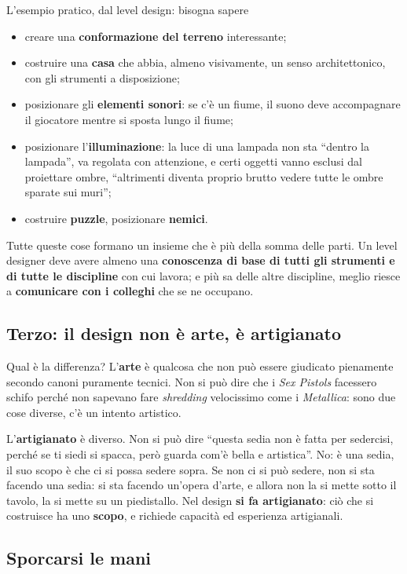 L'esempio pratico, dal level design: bisogna sapere
\begin{itemize}
  \item creare una \textbf{conformazione del terreno} interessante;
  \item costruire una \textbf{casa} che abbia, almeno visivamente, un senso
        architettonico, con gli strumenti a disposizione;
  \item posizionare gli \textbf{elementi sonori}: se c'è un fiume, il suono
        deve accompagnare il giocatore mentre si sposta lungo il fiume;
  \item posizionare l'\textbf{illuminazione}: la luce di una lampada non sta
        ``dentro la lampada'', va regolata con attenzione, e certi oggetti
        vanno esclusi dal proiettare ombre, ``altrimenti diventa proprio
        brutto vedere tutte le ombre sparate sui muri'';
  \item costruire \textbf{puzzle}, posizionare \textbf{nemici}.
\end{itemize}
Tutte queste cose formano un insieme che è più della somma delle parti. Un
level designer deve avere almeno una \textbf{conoscenza di base di tutti gli
strumenti e di tutte le discipline} con cui lavora; e più sa delle altre
discipline, meglio riesce a \textbf{comunicare con i colleghi} che se ne
occupano.

\subsection{Terzo: il design non è arte, è artigianato}

Qual è la differenza? L'\textbf{arte} è qualcosa che non può essere giudicato
pienamente secondo canoni puramente tecnici. Non si può dire che i
\emph{Sex Pistols} facessero schifo perché non sapevano fare
\emph{shredding} velocissimo come i \emph{Metallica}: sono due cose diverse,
c'è un intento artistico.

L'\textbf{artigianato} è diverso. Non si può dire ``questa sedia non è fatta
per sedercisi, perché se ti siedi si spacca, però guarda com'è bella e
artistica''. No: è una sedia, il suo scopo è che ci si possa sedere sopra. Se
non ci si può sedere, non si sta facendo una sedia: si sta facendo un'opera
d'arte, e allora non la si mette sotto il tavolo, la si mette su un
piedistallo. Nel design \textbf{si fa artigianato}: ciò che si costruisce ha
uno \textbf{scopo}, e richiede capacità ed esperienza artigianali.

\subsection{Sporcarsi le mani}

